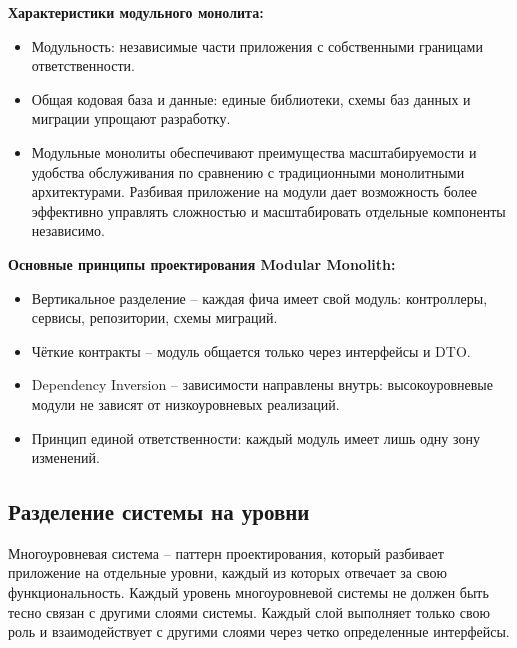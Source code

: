 \documentclass[a4paper,12pt]{report}
\begin{document}
\textbf{Характеристики модульного монолита:}
\begin{itemize}
    \item
        Модульность: независимые части приложения с собственными границами ответственности.
    \item 
        Общая кодовая база и данные: единые библиотеки, схемы баз данных и миграции упрощают разработку.
    \item
        Модульные монолиты обеспечивают преимущества масштабируемости и удобства обслуживания по сравнению 
        с традиционными монолитными архитектурами. Разбивая приложение на модули дает возможность более 
        эффективно управлять сложностью и масштабировать отдельные компоненты независимо.
\end{itemize}

\textbf{Основные принципы проектирования Modular Monolith:}
\begin{itemize}
    \item
        Вертикальное разделение -- каждая фича имеет свой модуль: контроллеры, сервисы, репозитории, схемы миграций.
    \item
        Чёткие контракты -- модуль общается только через интерфейсы и DTO.
    \item
        Dependency Inversion -- зависимости направлены внутрь: высокоуровневые модули не зависят от низкоуровневых реализаций.
    \item
        Принцип единой ответственности: каждый модуль имеет лишь одну зону изменений.
\end{itemize}

\subsection{Разделение системы на уровни}

Многоуровневая система -- паттерн проектирования, который разбивает приложение на отдельные уровни, каждый из которых отвечает 
за свою функциональность. Каждый уровень многоуровневой системы не должен быть тесно связан с другими слоями системы. Каждый слой 
выполняет только свою роль и взаимодействует с другими слоями через четко определенные интерфейсы.
\end{document}
